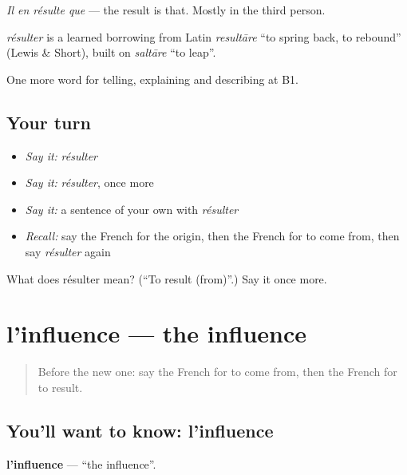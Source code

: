 \emph{Il en résulte que} — the result is that. Mostly in the third person.

\begin{cousinweb}
\emph{résulter} is a learned borrowing from Latin \emph{resultāre} \textquotedblleft{}to spring back, to rebound\textquotedblright{} (Lewis \& Short), built on \emph{saltāre} \textquotedblleft{}to leap\textquotedblright{}.
\end{cousinweb}

\begin{grammarlens}[title={What you've built}]
One more word for telling, explaining and describing at B1.
\end{grammarlens}

\subsection*{Your turn}
\begin{itemize}
\raggedright
  \item \emph{Say it:} \emph{résulter}
  \item \emph{Say it:} \emph{résulter}, once more
  \item \emph{Say it:} a sentence of your own with \emph{résulter}
  \item \emph{Recall:} say the French for the origin, then the French for to come from, then say \emph{résulter} again
\end{itemize}

\begin{tcolorbox}[breakable,colback=teal!4,colframe=teal!35!black,title={Before you move on}]
What does résulter mean? (\textquotedblleft{}To result (from)\textquotedblright{}.) Say it once more.
\end{tcolorbox}
\section[l'influence]{l'influence — the influence}

\label{lesson:FR-C349-influence}



\begin{quote}
Before the new one: say the French for to come from, then the French for to result.
\end{quote}

\subsection*{You'll want to know: l'influence}
\textbf{l'influence} — \textquotedblleft{}the influence\textquotedblright{}.


